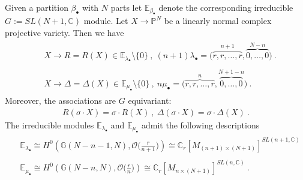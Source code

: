 \documentclass[12pt]{amsart}
\numberwithin{equation}{section}
\numberwithin{remark}{section}
\numberwithin{theorem}{section}
\numberwithin{proposition}{section}
\numberwithin{definition}{section}
\numberwithin{lemma}{section}
\numberwithin{claim}{section}
\numberwithin{corollary}{section}
\numberwithin{conjecture}{section}
\begin{document}
  Given a partition $\beta_{\ensuremath{{}\bullet{}}}$ with $N$ parts let $\mathbb{E}_{\beta_{\ensuremath{{}\bullet{}}}}$ denote the corresponding irreducible  $G:={\ensuremath{SL(N+1,\mathbb{C})}}$ module. 
   Let $X{\ensuremath{\longrightarrow}}{\ensuremath{\mathbb{P}^{N}}}$ be a linearly normal complex projective variety. Then we have
 \begin{align}
\begin{split}
& X  \rightarrow R=R(X) \in {\ensuremath{\mathbb{E}_{\lambda_{\ensuremath{{}\bullet{}}}}}}\setminus\{0\} \ , \ (n+1)\lambda_{\ensuremath{{}\bullet{}}}= \big(\overbrace{ {r} , {r} ,\dots, {r}}^{n+1},\overbrace{0,\dots,0}^{N-n}\big) \ .\\
\ \\
& X \rightarrow \Delta=\Delta(X) \in {\ensuremath{\mathbb{E}_{\mu_{\ensuremath{{}\bullet{}}}}}}\setminus\{0\} \ , \  n\mu_{\ensuremath{{}\bullet{}}}= \big(\overbrace{ {r} , {r} ,\dots, {r}}^{n },\overbrace{0,\dots,0}^{N+1-n}\big) \ . 
\end{split}
\end{align}
 Moreover, the associations are $G$ equivariant:
\begin{align}
 R(\sigma\cdot X)=\sigma\cdot R(X) \ , \ \Delta(\sigma\cdot X)=\sigma\cdot \Delta(X) \ .
 \end{align}
The irreducible modules ${\ensuremath{\mathbb{E}_{\lambda_{\ensuremath{{}\bullet{}}}}}}$ and ${\ensuremath{\mathbb{E}_{\mu_{\ensuremath{{}\bullet{}}}}}}$ admit the following descriptions
\begin{align}
\begin{split}
&{\ensuremath{\mathbb{E}_{\lambda_{\ensuremath{{}\bullet{}}}}}}\cong  H^0(\mathbb{G}(N-n-1,N), \mathcal{O}\Big(\frac{r}{n+1}\Big))\cong \mathbb{C}_{r}[M_{(n+1)\times (N+1)}]^{SL(n+1,\mathbb{C})} \\
\ \\
& {\ensuremath{\mathbb{E}_{\mu_{\ensuremath{{}\bullet{}}}}}} \cong H^0(\mathbb{G}(N-n ,N), \mathcal{O}\Big(\frac{r}{n}\Big))\cong \mathbb{C}_{r}[M_{n\times (N+1)}]^{SL(n,\mathbb{C})}\ . 
\end{split}
\end{align}
\end{document}
